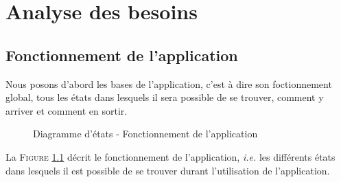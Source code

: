 \chapter{Analyse des besoins}

\section{Fonctionnement de l'application}

Nous posons d'abord les bases de l'application, c'est à dire son foctionnement global, tous les états dans lesquels il sera possible de se trouver, comment y arriver et comment en sortir.

 \begin{figure}[!ht]
 \begin{center}
  \caption{Diagramme d'états - Fonctionnement de l'application}
  \label{etattrans}
 \end{center}
 \end{figure}


 La \textsc{Figure} \ref{etattrans} décrit le fonctionnement de l'application, \textit{i.e.} les différents états dans lesquels il est possible de se trouver durant l'utilisation de l'application.


